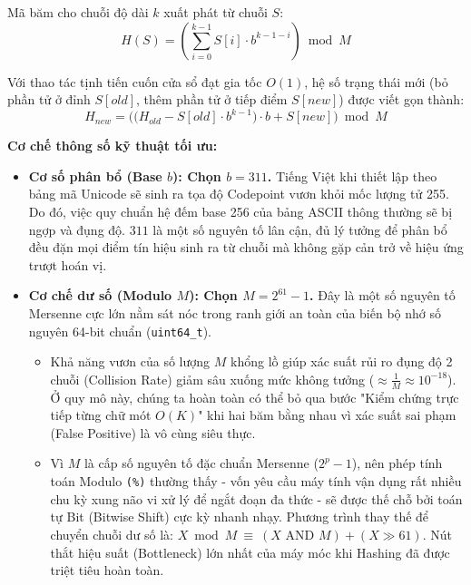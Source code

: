 \documentclass[a4paper,12pt]{article}
\begin{document}
Mã băm cho chuỗi độ dài $k$ xuất phát từ chuỗi $S$:
\begin{equation}
    H(S) = \left( \sum_{i=0}^{k-1} S[i] \cdot b^{k-1-i} \right) \bmod M 
\end{equation}

Với thao tác tịnh tiến cuốn cửa sổ đạt gia tốc $O(1)$, hệ số trạng thái mới (bỏ phần tử ở đỉnh $S[old]$, thêm phần tử ở tiếp điểm $S[new]$) được viết gọn thành:
\begin{equation}
    H_{new} = \Big( \big(H_{old} - S[old] \cdot b^{k-1}\big) \cdot b + S[new] \Big) \bmod M 
\end{equation}

\textbf{Cơ chế thông số kỹ thuật tối ưu:}
\begin{itemize}
    \item \textbf{Cơ số phân bổ (Base $b$): Chọn $b = 311$.} Tiếng Việt khi thiết lập theo bảng mã Unicode sẽ sinh ra tọa độ Codepoint vươn khỏi mốc lượng tử 255. Do đó, việc quy chuẩn hệ đếm base 256 của bảng ASCII thông thường sẽ bị ngợp và đụng độ. $311$ là một số nguyên tố lân cận, đủ lý tưởng để phân bổ đều đặn mọi điểm tín hiệu sinh ra từ chuỗi mà không gặp cản trở về hiệu ứng trượt hoán vị.
    \item \textbf{Cơ chế dư số (Modulo $M$): Chọn $M = 2^{61} - 1$.} Đây là một số nguyên tố Mersenne cực lớn nằm sát nóc trong ranh giới an toàn của biến bộ nhớ số nguyên 64-bit chuẩn (\texttt{uint64\_t}). 
    \begin{itemize}
        \item Khả năng vươn của số lượng $M$ khổng lồ giúp xác suất rủi ro đụng độ 2 chuỗi (Collision Rate) giảm sâu xuống mức không tưởng ($ \approx \frac{1}{M} \approx 10^{-18} $). Ở quy mô này, chúng ta hoàn toàn có thể bỏ qua bước "Kiểm chứng trực tiếp từng chữ mót $O(K)$" khi hai băm bằng nhau vì xác suất sai phạm (False Positive) là vô cùng siêu thực.
        \item Vì $M$ là cấp số nguyên tố đặc chuẩn Mersenne ($2^p - 1$), nên phép tính toán Modulo \texttt{(\%)} thường thấy - vốn yêu cầu máy tính vận dụng rất nhiều chu kỳ xung não vi xử lý để ngắt đoạn đa thức - sẽ được thế chỗ bởi toán tự Bit (Bitwise Shift) cực kỳ nhanh nhạy. Phương trình thay thế để chuyển chuỗi dư số là: $X \bmod M \ \equiv \ (X \text{ AND } M) + (X \gg 61)$. Nút thắt hiệu suất (Bottleneck) lớn nhất của máy móc khi Hashing đã được triệt tiêu hoàn toàn.
    \end{itemize}
\end{itemize}
\end{document}
